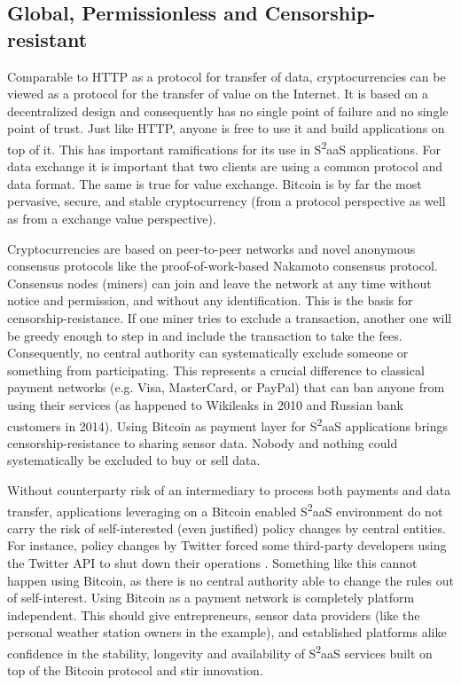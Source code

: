 \subsection{Global, Permissionless and Censorship-resistant}

Comparable to \ac{HTTP} as a protocol for transfer of data, cryptocurrencies can be viewed as a protocol for the transfer of value on the Internet. It is based on a decentralized design and consequently has no single point of failure and no single point of trust. Just like \ac{HTTP}, anyone is free to use it and build applications on top of it. This has important ramifications for its use in S\textsuperscript{2}aaS applications. For data exchange it is important that two clients are using a common protocol and data format. The same is true for value exchange. Bitcoin is by far the most pervasive, secure, and stable cryptocurrency (from a protocol perspective as well as from a exchange value perspective).

Cryptocurrencies are based on peer-to-peer networks and novel anonymous consensus protocols like the proof-of-work-based Nakamoto consensus protocol. Consensus nodes (miners) can join and leave the network at any time without notice and permission, and without any identification. This is the basis for censorship-resistance. If one miner tries to exclude a transaction, another one will be greedy enough to step in and include the transaction to take the fees. Consequently, no central authority can systematically exclude someone or something from participating. This represents a crucial difference to classical payment networks (e.g. Visa, MasterCard, or PayPal) that can ban anyone from using their services (as happened to Wikileaks in 2010 and Russian bank customers in 2014). Using Bitcoin as payment layer for S\textsuperscript{2}aaS applications brings censorship-resistance to sharing sensor data. Nobody and nothing could systematically be excluded to buy or sell data.

Without counterparty risk of an intermediary to process both payments and data transfer, applications leveraging on a Bitcoin enabled S\textsuperscript{2}aaS  environment do not carry the risk of self-interested (even justified) policy changes by central entities. For instance, policy changes by Twitter forced some third-party developers using the Twitter \ac{API} to shut down their operations \parencite{twitterAPI}. Something like this cannot happen using Bitcoin, as there is no central authority able to change the rules out of self-interest. Using Bitcoin as a payment network is completely platform independent. This should give entrepreneurs, sensor data providers (like the personal weather station owners in the example), and established platforms alike confidence in the stability, longevity and availability of S\textsuperscript{2}aaS services built on top of the Bitcoin protocol and stir innovation.

